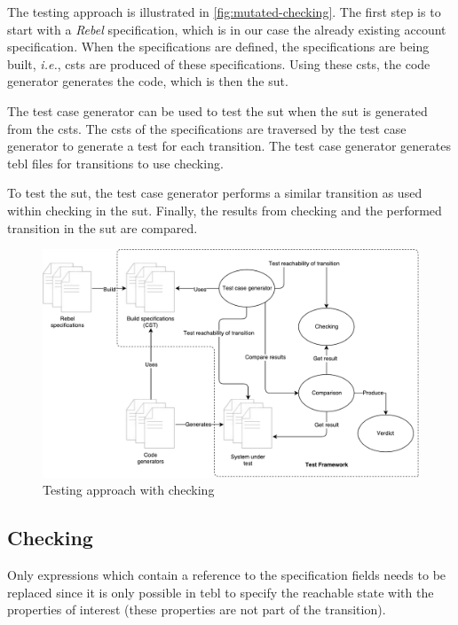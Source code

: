 The testing approach is illustrated in \autoref{fig:mutated-checking}. The first
step is to start with a \textit{Rebel} specification, which is in our case the already
existing account specification. When the specifications are defined, the
specifications are being built, \textit{i.e.}, \gls{csts} are
produced of these specifications. Using these \gls{csts}, the code generator generates
the code, which is then the \gls{sut}.

The test case generator can be used to test the \gls{sut} when the \gls{sut} is generated
from the \gls{csts}. The \gls{csts} of the specifications are traversed by the test case
generator to generate a test for each transition. The test case generator
generates tebl files for transitions to use checking.

To test the \gls{sut}, the test case generator performs a similar transition
as used within checking in the \gls{sut}. Finally, the results from checking and the
performed transition in the \gls{sut} are compared.

\begin{figure}[h!]
  \centering
  \includegraphics[width=\linewidth{}]{figures/mutated-checking-diagram.pdf}
  \caption{Testing approach with checking}\label{fig:mutated-checking}
\end{figure}
\FloatBarrier

\subsection{Checking}
Only expressions which contain a reference to the specification fields needs to
be replaced since it is only possible in tebl to specify the reachable state
with the properties of interest (these properties are not part of the
transition).

